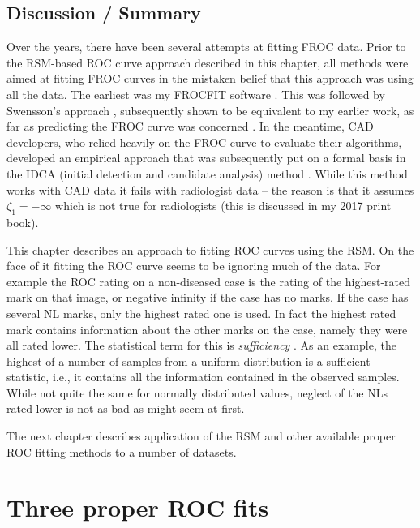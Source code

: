 \documentclass[
]{book}
\begin{document}
\hypertarget{rsm-fitting-discussion-summary}{%
\section{Discussion / Summary}\label{rsm-fitting-discussion-summary}}

Over the years, there have been several attempts at fitting FROC data. Prior to the RSM-based ROC curve approach described in this chapter, all methods were aimed at fitting FROC curves in the mistaken belief that this approach was using all the data. The earliest was my FROCFIT software \citep{chakraborty1989maximum}. This was followed by Swensson's approach \citep{swensson1996unified}, subsequently shown to be equivalent to my earlier work, as far as predicting the FROC curve was concerned \citep{chakraborty2008operating}. In the meantime, CAD developers, who relied heavily on the FROC curve to evaluate their algorithms, developed an empirical approach that was subsequently put on a formal basis in the IDCA (initial detection and candidate analysis) method \citep{edwards2002maximum}. While this method works with CAD data it fails with radiologist data -- the reason is that it assumes \(\zeta_1 = -\infty\) which is not true for radiologists (this is discussed in my 2017 print book).

This chapter describes an approach to fitting ROC curves using the RSM. On the face of it fitting the ROC curve seems to be ignoring much of the data. For example the ROC rating on a non-diseased case is the rating of the highest-rated mark on that image, or negative infinity if the case has no marks. If the case has several NL marks, only the highest rated one is used. In fact the highest rated mark contains information about the other marks on the case, namely they were all rated lower. The statistical term for this is \emph{sufficiency} \citep{larsen2005introduction}. As an example, the highest of a number of samples from a uniform distribution is a sufficient statistic, i.e., it contains all the information contained in the observed samples. While not quite the same for normally distributed values, neglect of the NLs rated lower is not as bad as might seem at first.

The next chapter describes application of the RSM and other available proper ROC fitting methods to a number of datasets.

\hypertarget{rsm-3-fits}{%
\chapter{Three proper ROC fits}\label{rsm-3-fits}}
\end{document}
